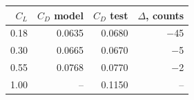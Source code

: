 \begin{tabular}{@{}rrrr@{}}
\toprule
$C_L$ & $C_D$ model & $C_D$ test & $\Delta$, counts \\
\midrule
0.18 & 0.0635 & 0.0680 & $-$45 \\
0.30 & 0.0665 & 0.0670 & $-$5 \\
0.55 & 0.0768 & 0.0770 & $-$2 \\
1.00 & -- & 0.1150 & -- \\
\bottomrule
\end{tabular}
